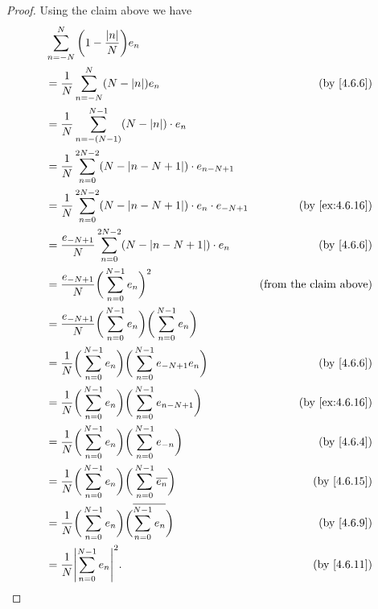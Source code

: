 \begin{proof}
  Using the claim above we have
  \begin{align*}
     & \sum_{n = -N}^N \bigg(1 - \frac{\abs{n}}{N}\bigg) e_n                                                                              \\
     & = \frac{1}{N} \sum_{n = -N}^N (N - \abs{n}) e_n                                                    & \text{(by \cref{4.6.6})}      \\
     & = \frac{1}{N} \sum_{n = -(N - 1)}^{N - 1} (N - \abs{n}) \cdot e_n                                                                  \\
     & = \frac{1}{N} \sum_{n = 0}^{2N - 2} (N - \abs{n - N + 1}) \cdot e_{n - N + 1}                                                      \\
     & = \frac{1}{N} \sum_{n = 0}^{2N - 2} (N - \abs{n - N + 1}) \cdot e_n \cdot e_{-N + 1}               & \text{(by \cref{ex:4.6.16})}  \\
     & = \frac{e_{-N + 1}}{N} \sum_{n = 0}^{2N - 2} (N - \abs{n - N + 1}) \cdot e_n                       & \text{(by \cref{4.6.6})}      \\
     & = \frac{e_{-N + 1}}{N} \bigg(\sum_{n = 0}^{N - 1} e_n\bigg)^2                                      & \text{(from the claim above)} \\
     & = \frac{e_{-N + 1}}{N} \bigg(\sum_{n = 0}^{N - 1} e_n\bigg) \bigg(\sum_{n = 0}^{N - 1} e_n\bigg)                                   \\
     & = \frac{1}{N} \bigg(\sum_{n = 0}^{N - 1} e_n\bigg) \bigg(\sum_{n = 0}^{N - 1} e_{-N + 1} e_n\bigg) & \text{(by \cref{4.6.6})}      \\
     & = \frac{1}{N} \bigg(\sum_{n = 0}^{N - 1} e_n\bigg) \bigg(\sum_{n = 0}^{N - 1} e_{n - N + 1}\bigg)  & \text{(by \cref{ex:4.6.16})}  \\
     & = \frac{1}{N} \bigg(\sum_{n = 0}^{N - 1} e_n\bigg) \bigg(\sum_{n = 0}^{N - 1} e_{-n}\bigg)         & \text{(by \cref{4.6.4})}      \\
     & = \frac{1}{N} \bigg(\sum_{n = 0}^{N - 1} e_n\bigg) \bigg(\sum_{n = 0}^{N - 1} \overline{e_n}\bigg) & \text{(by \cref{4.6.15})}     \\
     & = \frac{1}{N} \bigg(\sum_{n = 0}^{N - 1} e_n\bigg) \bigg(\overline{\sum_{n = 0}^{N - 1} e_n}\bigg) & \text{(by \cref{4.6.9})}      \\
     & = \frac{1}{N} \abs{\sum_{n = 0}^{N - 1} e_n}^2.                                                    & \text{(by \cref{4.6.11})}
  \end{align*}
\end{proof}


